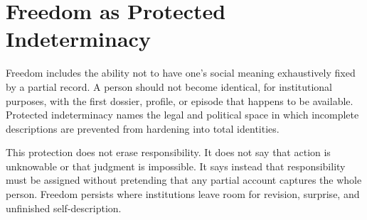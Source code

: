 
\chapter{Freedom as Protected Indeterminacy}
\label{ch:ch105}

Freedom includes the ability not to have one's social meaning exhaustively fixed by a partial record. A person should not become identical, for institutional purposes, with the first dossier, profile, or episode that happens to be available. Protected indeterminacy names the legal and political space in which incomplete descriptions are prevented from hardening into total identities.

This protection does not erase responsibility. It does not say that action is unknowable or that judgment is impossible. It says instead that responsibility must be assigned without pretending that any partial account captures the whole person. Freedom persists where institutions leave room for revision, surprise, and unfinished self-description.
